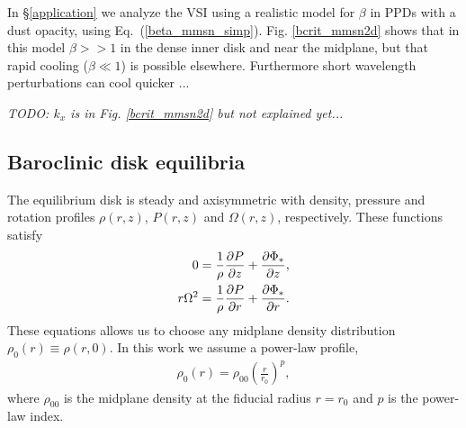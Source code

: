 In \S\ref{application} we analyze the VSI using a realistic model for 
$\beta$ in PPDs with a dust opacity, using Eq.\ (\ref{beta_mmsn_simp}).  
 Fig. \ref{bcrit_mmsn2d} shows that in this model $\beta >> 1$ in the 
 dense inner disk and near the midplane, but that rapid cooling ($\beta \ll 1$)
 is possible elsewhere.  Furthermore short wavelength perturbations can cool 
 quicker ...
 
 \emph{TODO: $k_x$ is in Fig. \ref{bcrit_mmsn2d} but not explained yet...}



\subsection{Baroclinic disk equilibria}\label{eqm}
The equilibrium disk is steady and axisymmetric with density,
pressure and rotation profiles $\rho(r,z)$, $P(r,z)$ and
$\Omega(r,z)$, respectively. These functions satisfy  
\begin{align}
  0 &= \frac{1}{\rho}\frac{\partial P}{\partial z} + \frac{\partial \Phi_*}{\partial z},\label{vert_equilibrium}\\
  r\Omega^2&= \frac{1}{\rho}\frac{\partial P}{\partial r} + \frac{\partial \Phi_*}{\partial
    r}.\label{hori_equilibrium} 
\end{align} 
These equations allows us to choose any midplane density 
distribution $\rho_0(r)\equiv \rho(r,0)$. In this work we assume a
power-law profile, 
\begin{align}
  \rho_0(r) = \rho_{00}\left(\frac{r}{r_0}\right)^p,
\end{align}
where $\rho_{00}$ is the midplane density at the fiducial radius
$r=r_0$ and $p$ is the power-law index.  

